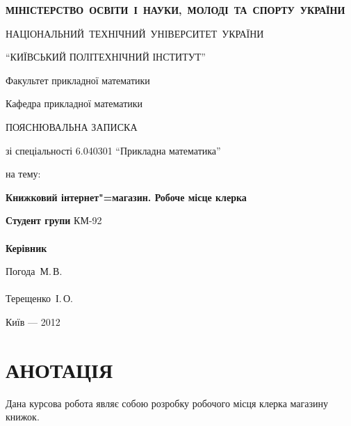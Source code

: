 \documentclass[a4paper,notitlepage,headsepline,pdftex,oneside]{report}
\newcommand{\setfontsize}[1]{\fontsize{#1pt}{#1pt}\selectfont}
\newcommand{\uChapter}[1]{\chapter*{#1}\pagestyle{fancy}\renewcommand{\baselinestretch}{1.5}\setfontsize{14pt}}
\begin{document}
\setfontsize{14pt}
\renewcommand{\baselinestretch}{1.5}
\begin{titlepage}
  \begin{center}
\setfontsize{14pt}
\renewcommand{\baselinestretch}{1.5}
{\bf
    \mbox{\MakeUppercase{Міністерство освіти і науки, молоді та спорту
    України}}

    \mbox{\MakeUppercase{Національний технічний університет України}}

    \MakeUppercase{``Київський політехнічний інститут''}

    \vspace{2cm}


    Факультет прикладної математики

    Кафедра прикладної математики

    \vfill

    ПОЯСНЮВАЛЬНА ЗАПИСКА
  }

    зі спеціальності 6.040301 ``Прикладна математика''

    на тему:

    \textbf{Книжковий інтернет"=магазин. Робоче місце клерка}
  \end{center}

  \vfill

  \begin{minipage}{0.4\textwidth}
  \noindent
  \textbf{Студент групи} КМ-92\\
  \hspace{1cm}\\
  \noindent
  \textbf{Керівник}\\
  \end{minipage}
  \begin{minipage}{0.4\textwidth}
    \noindent
    Погода~М.\,В.\hfill\underline{\hspace{1.5cm}}\\
    \hspace{1cm}\\
    \noindent
    Терещенко~І.\,О.\hfill\underline{\hspace{1.5cm}}\\
  \end{minipage}

  \vfill

  \begin{center}
    Київ --- 2012
  \end{center}
\end{titlepage}
\uChapter{АНОТАЦІЯ}
  Дана курсова робота являє собою розробку робочого місця клерка магазину
  книжок.
\end{document}
